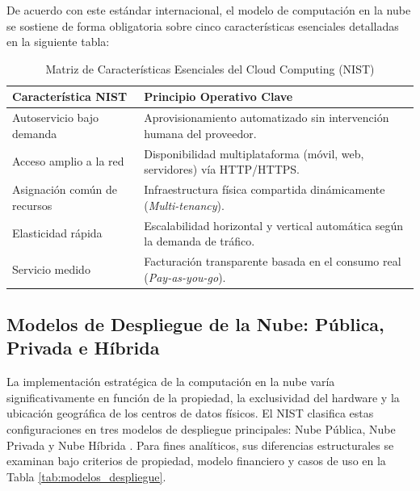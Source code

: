 \documentclass[12pt,a4paper]{article}
\begin{document}
De acuerdo con este estándar internacional, el modelo de computación en la nube se sostiene de forma obligatoria sobre cinco características esenciales detalladas en la siguiente tabla:

\vspace{0.3cm}
\begin{table}[H]
\centering
\caption{Matriz de Características Esenciales del Cloud Computing (NIST)}
\label{tab:nist_caracteristicas}
\begin{tabular}{ p{4.5cm} p{8cm} }
\toprule
\textbf{Característica NIST} & \textbf{Principio Operativo Clave} \\
\midrule
Autoservicio bajo demanda & Aprovisionamiento automatizado sin intervención humana del proveedor. \\
Acceso amplio a la red & Disponibilidad multiplataforma (móvil, web, servidores) vía HTTP/HTTPS. \\
Asignación común de recursos & Infraestructura física compartida dinámicamente (\textit{Multi-tenancy}). \\
Elasticidad rápida & Escalabilidad horizontal y vertical automática según la demanda de tráfico. \\
Servicio medido & Facturación transparente basada en el consumo real (\textit{Pay-as-you-go}). \\
\bottomrule
\end{tabular}
\end{table}
\vspace{0.3cm}
\subsection{Modelos de Despliegue de la Nube: Pública, Privada e Híbrida}

La implementación estratégica de la computación en la nube varía significativamente en función de la propiedad, la exclusividad del hardware y la ubicación geográfica de los centros de datos físicos. El NIST clasifica estas configuraciones en tres modelos de despliegue principales: Nube Pública, Nube Privada y Nube Híbrida \parencite{mell2011}. Para fines analíticos, sus diferencias estructurales se examinan bajo criterios de propiedad, modelo financiero y casos de uso en la Tabla \ref{tab:modelos_despliegue}.
\end{document}
